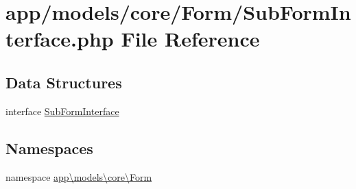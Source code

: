 \hypertarget{_sub_form_interface_8php}{\section{app/models/core/\-Form/\-Sub\-Form\-Interface.php File Reference}
\label{_sub_form_interface_8php}
}
\subsection*{Data Structures}
\begin{DoxyCompactItemize}
\item 
interface \hyperlink{interfaceapp_1_1models_1_1core_1_1_form_1_1_sub_form_interface}{Sub\-Form\-Interface}
\end{DoxyCompactItemize}
\subsection*{Namespaces}
\begin{DoxyCompactItemize}
\item 
namespace \hyperlink{namespaceapp_1_1models_1_1core_1_1_form}{app\textbackslash{}models\textbackslash{}core\textbackslash{}\-Form}
\end{DoxyCompactItemize}
